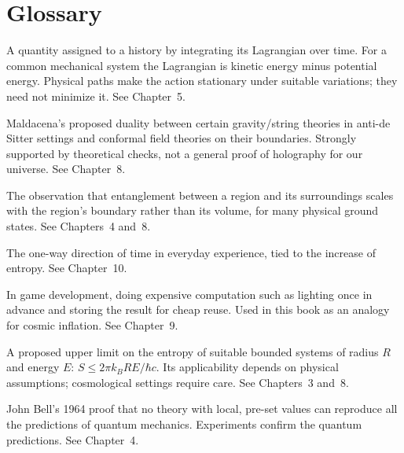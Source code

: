 \chapter*{Glossary}

\begin{description}[
    style=nextline,
    leftmargin=2.2em,
    labelwidth=2em,
    labelsep=0.4em,
    itemsep=0.65em,
    parsep=0pt,
    topsep=0.25em
]

\item[Action] A quantity assigned to a history by integrating its Lagrangian over time. For a common mechanical system the Lagrangian is kinetic energy minus potential energy. Physical paths make the action stationary under suitable variations; they need not minimize it. See Chapter~5.

\item[AdS/CFT correspondence] Maldacena's proposed duality between certain gravity/string theories in anti-de Sitter settings and conformal field theories on their boundaries. Strongly supported by theoretical checks, not a general proof of holography for our universe. See Chapter~8.

\item[Area law] The observation that entanglement between a region and its surroundings scales with the region's boundary rather than its volume, for many physical ground states. See Chapters~4 and~8.

\item[Arrow of time] The one-way direction of time in everyday experience, tied to the increase of entropy. See Chapter~10.

\item[Asset baking] In game development, doing expensive computation such as lighting once in advance and storing the result for cheap reuse. Used in this book as an analogy for cosmic inflation. See Chapter~9.

\item[Bekenstein bound] A proposed upper limit on the entropy of suitable bounded systems of radius \(R\) and energy \(E\): \(S \le 2\pi k_B R E / \hbar c\). Its applicability depends on physical assumptions; cosmological settings require care. See Chapters~3 and~8.

\item[Bell's theorem] John Bell's 1964 proof that no theory with local, pre-set values can reproduce all the predictions of quantum mechanics. Experiments confirm the quantum predictions. See Chapter~4.


\end{description}
